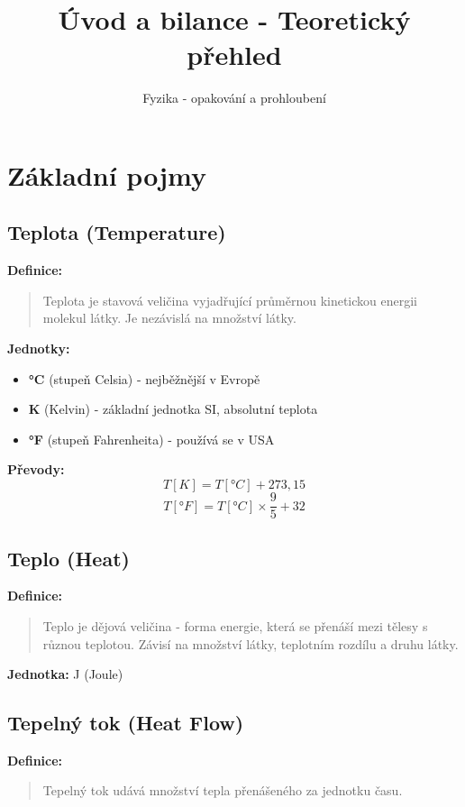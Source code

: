 \documentclass[11pt,a4paper]{article}
\title{Úvod a bilance - Teoretický přehled}
\author{Fyzika - opakování a prohloubení}
\date{}
\begin{document}
\maketitle

\section{Základní pojmy}

\subsection{Teplota (Temperature)}

\textbf{Definice:}
\begin{quote}
Teplota je stavová veličina vyjadřující průměrnou kinetickou energii molekul látky. Je nezávislá na množství látky.
\end{quote}

\textbf{Jednotky:}
\begin{itemize}
\item \textbf{°C} (stupeň Celsia) - nejběžnější v Evropě
\item \textbf{K} (Kelvin) - základní jednotka SI, absolutní teplota
\item \textbf{°F} (stupeň Fahrenheita) - používá se v USA
\end{itemize}

\textbf{Převody:}
\[T[K] = T[°C] + 273{,}15\]
\[T[°F] = T[°C] \times \frac{9}{5} + 32\]

\subsection{Teplo (Heat)}

\textbf{Definice:}
\begin{quote}
Teplo je dějová veličina - forma energie, která se přenáší mezi tělesy s různou teplotou. Závisí na množství látky, teplotním rozdílu a druhu látky.
\end{quote}

\textbf{Jednotka:} J (Joule)

\subsection{Tepelný tok (Heat Flow)}

\textbf{Definice:}
\begin{quote}
Tepelný tok udává množství tepla přenášeného za jednotku času.
\end{quote}
\end{document}
